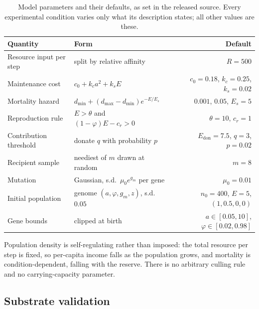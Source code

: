 \documentclass[review,3p,times]{elsarticle}
\begin{document}
\begin{table}[ht]
\centering\small
\caption{Model parameters and their defaults, as set in the released source.
Every experimental condition varies only what its description states; all
other values are these.}
\label{tab:params}
\begin{tabular}{llr}
\toprule
\textbf{Quantity} & \textbf{Form} & \textbf{Default}\\
\midrule
Resource input per step        & split by relative affinity            & $R=500$\\
Maintenance cost               & $c_0+k_c a^{2}+k_s E$                 & $c_0=0.18$, $k_c=0.25$, $k_s=0.02$\\
Mortality hazard               & $d_{\min}+(d_{\max}-d_{\min})e^{-E/E_s}$ & $0.001$, $0.05$, $E_s=5$\\
Reproduction rule              & $E>\theta$ and $(1-\varphi)E-c_{r}>0$  & $\theta=10$, $c_{r}=1$\\
Contribution threshold         & donate $q$ with probability $p$        & $E_{\mathrm{don}}=7.5$, $q=3$, $p=0.02$\\
Recipient sample               & neediest of $m$ drawn at random        & $m=8$\\
Mutation                       & Gaussian, s.d.\ $\mu_0e^{g_m}$ per gene & $\mu_0=0.01$\\
Initial population             & genome $(a,\varphi,g_m,z)$, s.d.\ $0.05$ & $n_0=400$, $E=5$, $(1,0.5,0,0)$\\
Gene bounds                    & clipped at birth                       & $a\in[0.05,10]$, $\varphi\in[0.02,0.98]$\\
\bottomrule
\end{tabular}
\end{table}

Population density is self-regulating rather than imposed: the total resource
per step is fixed, so per-capita income falls as the population grows, and
mortality is condition-dependent, falling with the reserve. There is no
arbitrary culling rule and no carrying-capacity parameter.

\subsection{Substrate validation}
\end{document}
